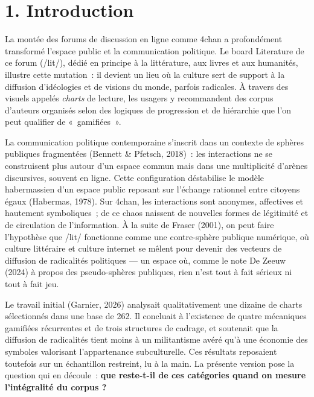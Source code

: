 \documentclass[11pt,a4paper]{article}
\begin{document}
\section*{1. Introduction}

La montée des forums de discussion en ligne comme 4chan a profondément transformé l'espace public et la communication politique. Le board Literature de ce forum (/lit/), dédié en principe à la littérature, aux livres et aux humanités, illustre cette mutation~: il devient un lieu où la culture sert de support à la diffusion d'idéologies et de visions du monde, parfois radicales. À travers des visuels appelés \emph{charts} de lecture, les usagers y recommandent des corpus d'auteurs organisés selon des logiques de progression et de hiérarchie que l'on peut qualifier de «~gamifiées~».

La communication politique contemporaine s'inscrit dans un contexte de sphères publiques fragmentées (Bennett \& Pfetsch, 2018)~: les interactions ne se construisent plus autour d'un espace commun mais dans une multiplicité d'arènes discursives, souvent en ligne. Cette configuration déstabilise le modèle habermassien d'un espace public reposant sur l'échange rationnel entre citoyens égaux (Habermas, 1978). Sur 4chan, les interactions sont anonymes, affectives et hautement symboliques~; de ce chaos naissent de nouvelles formes de légitimité et de circulation de l'information. À la suite de Fraser (2001), on peut faire l'hypothèse que /lit/ fonctionne comme une contre-sphère publique numérique, où culture littéraire et culture internet se mêlent pour devenir des vecteurs de diffusion de radicalités politiques --- un espace où, comme le note De Zeeuw (2024) à propos des pseudo-sphères publiques, rien n'est tout à fait sérieux ni tout à fait jeu.

Le travail initial (Garnier, 2026) analysait qualitativement une dizaine de charts sélectionnés dans une base de 262. Il concluait à l'existence de quatre mécaniques gamifiées récurrentes et de trois structures de cadrage, et soutenait que la diffusion de radicalités tient moins à un militantisme avéré qu'à une économie des symboles valorisant l'appartenance subculturelle. Ces résultats reposaient toutefois sur un échantillon restreint, lu à la main. La présente version pose la question qui en découle~: \textbf{que reste-t-il de ces catégories quand on mesure l'intégralité du corpus ?}
\end{document}
